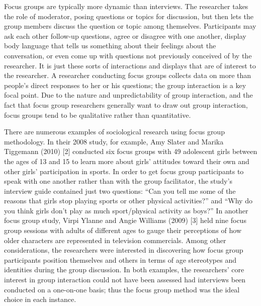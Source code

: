 Focus groups are typically more dynamic than interviews. The researcher takes the role of moderator, posing questions or topics for discussion, but then lets the group members discuss the question or topic among themselves. Participants may ask each other follow-up questions, agree or disagree with one another, display body language that tells us something about their feelings about the conversation, or even come up with questions not previously conceived of by the researcher. It is just these sorts of interactions and displays that are of interest to the researcher. A researcher conducting focus groups collects data on more than people’s direct responses to her or his questions; the group interaction is a key focal point. Due to the nature and unpredictability of group interaction, and the fact that focus group researchers generally want to draw out group interaction, focus groups tend to be qualitative rather than quantitative.

There are numerous examples of sociological research using focus group methodology. In their 2008 study, for example, Amy Slater and Marika Tiggemann (2010) [2] conducted six focus groups with 49 adolescent girls between the ages of 13 and 15 to learn more about girls’ attitudes toward their own and other girls’ participation in sports. In order to get focus group participants to speak with one another rather than with the group facilitator, the study’s interview guide contained just two questions: “Can you tell me some of the reasons that girls stop playing sports or other physical activities?” and “Why do you think girls don’t play as much sport/physical activity as boys?” In another focus group study, Virpi Ylanne and Angie Williams (2009) [3] held nine focus group sessions with adults of different ages to gauge their perceptions of how older characters are represented in television commercials. Among other considerations, the researchers were interested in discovering how focus group participants position themselves and others in terms of age stereotypes and identities during the group discussion. In both examples, the researchers’ core interest in group interaction could not have been assessed had interviews been conducted on a one-on-one basis; thus the focus group method was the ideal choice in each instance.

